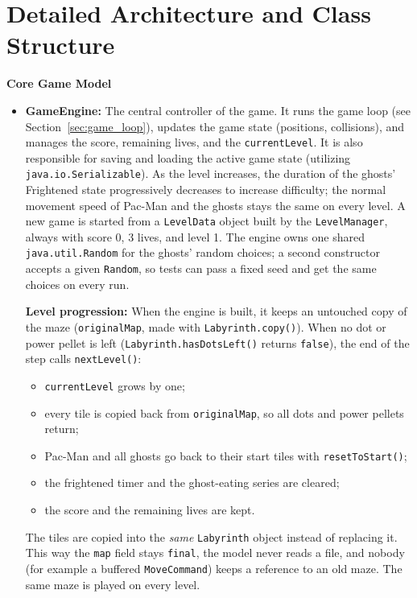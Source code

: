 \documentclass[11pt, a4paper]{article}
\begin{document}
\clearpage

\section{Detailed Architecture and Class Structure}

\textbf{Core Game Model}
\begin{itemize}
    \item \textbf{GameEngine:} The central controller of the game. It runs the game loop (see Section~\ref{sec:game_loop}), updates the game state (positions, collisions), and manages the score, remaining lives, and the \texttt{currentLevel}. It is also responsible for saving and loading the active game state (utilizing \texttt{java.io.Serializable}). As the level increases, the duration of the ghosts' Frightened state progressively decreases to increase difficulty; the normal movement speed of Pac-Man and the ghosts stays the same on every level. A new game is started from a \texttt{LevelData} object built by the \texttt{LevelManager}, always with score 0, 3 lives, and level 1. The engine owns one shared \texttt{java.util.Random} for the ghosts' random choices; a second constructor accepts a given \texttt{Random}, so tests can pass a fixed seed and get the same choices on every run.

    \textbf{Level progression:} When the engine is built, it keeps an untouched copy of the maze (\texttt{originalMap}, made with \texttt{Labyrinth.copy()}). When no dot or power pellet is left (\texttt{Labyrinth.hasDotsLeft()} returns \texttt{false}), the end of the step calls \texttt{nextLevel()}:
    \begin{itemize}
        \item \texttt{currentLevel} grows by one;
        \item every tile is copied back from \texttt{originalMap}, so all dots and power pellets return;
        \item Pac-Man and all ghosts go back to their start tiles with \texttt{resetToStart()};
        \item the frightened timer and the ghost-eating series are cleared;
        \item the score and the remaining lives are kept.
    \end{itemize}
    The tiles are copied into the \textit{same} \texttt{Labyrinth} object instead of replacing it. This way the \texttt{map} field stays \texttt{final}, the model never reads a file, and nobody (for example a buffered \texttt{MoveCommand}) keeps a reference to an old maze. The same maze is played on every level.


\end{itemize}
\end{document}
